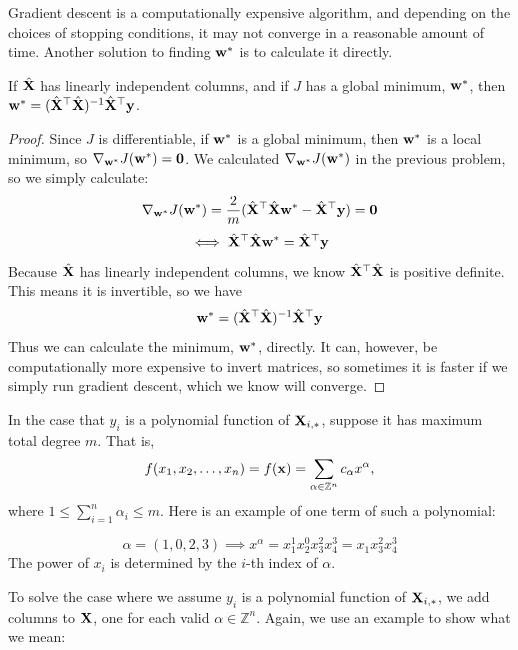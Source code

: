 Gradient descent is a computationally expensive algorithm, and depending on the choices of stopping conditions, it may not converge in a reasonable amount of time. Another solution to finding $\vw^\ast$ is to calculate it directly.
\begin{proposition}
If $\hat{\MX}$ has linearly independent columns, and if $J$ has a global minimum, $\vw^\ast$, then $\vw^\ast = (\hat{\MX} ^\top \hat{\MX})^{-1} \hat{\MX}^\top \vy$.
\begin{proof}
Since $J$ is differentiable, if $\vw^\ast$ is a global minimum, then $\vw^\ast$ is a local minimum, so $\nabla_{\vw^\ast} J(\vw^\ast) = \vzero $. We calculated $\nabla_{\vw^\ast} J(\vw^\ast)$ in the previous problem, so we simply calculate:
$$ \nabla_{\vw^\ast} J(\vw^\ast) = \frac{2}{m} (\hat{\MX} ^\top \hat{\MX} \vw^\ast - \hat{\MX}^\top \vy) = \vzero$$
$$ \iff \hat{\MX} ^\top \hat{\MX} \vw^\ast = \hat{\MX}^\top \vy$$
Because $\hat{\MX}$ has linearly independent columns, we know $\hat{\MX} ^\top \hat{\MX}$ is positive definite. This means it is invertible, so we have
$$ \vw^\ast = (\hat{\MX} ^\top \hat{\MX})^{-1} \hat{\MX}^\top \vy $$
Thus we can calculate the minimum, $\vw^\ast$, directly. It can, however, be computationally more expensive to invert matrices, so sometimes it is faster if we simply run gradient descent, which we know will converge.
\end{proof}
\end{proposition}

In the case that $y_i$ is a polynomial function of $\MX_{i,\ast}$, suppose it has maximum total degree $m$. That is, 
$$f(x_1, x_2, \ldots, x_n) = f(\vx) = \sum \limits_{\alpha \in \mathbb{Z}^n} c_\alpha x^\alpha,$$
where $1 \leq \sum \limits_{i=1}^{n} \alpha_i \leq m$. Here is an example of one term of such a polynomial:

\begin{example}
$$ \alpha = (1, 0, 2, 3) \implies x^\alpha = x_1^1 x_2^0 x_3^2 x_4^3 = x_1 x_3^2 x_4^3 $$
The power of $x_i$ is determined by the $i$-th index of $\alpha$.
\end{example}

To solve the case where we assume $y_i$ is a polynomial function of $\MX_{i,\ast}$, we add columns to $\MX$, one for each valid $\alpha \in \mathbb{Z}^n$. Again, we use an example to show what we mean:

